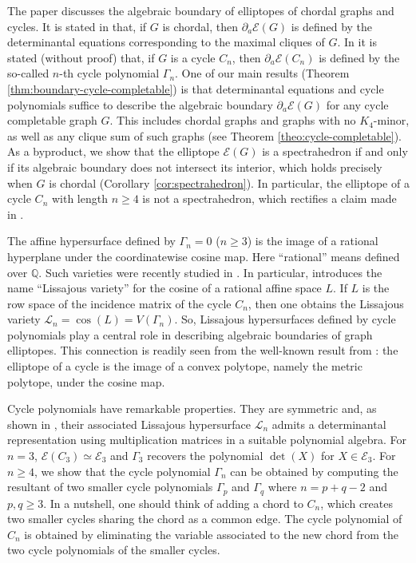 \documentclass[a4paper, 11pt, twoside]{article}
\newcommand{\ME}{{\mathcal E}}
\newcommand{\ML}{{\mathcal L}}
\theoremstyle{plain}
\begin{document}
The paper  \cite{Sturmfels2010MultivariateGaussians} discusses the algebraic boundary of elliptopes of chordal graphs and cycles. It is stated in \cite[Proposition 4.1]{Sturmfels2010MultivariateGaussians} that, if $G$ is chordal, then $\partial_a \ME(G)$ is defined by the determinantal equations corresponding to the maximal cliques of $G$. In \cite[Section 4.2]{Sturmfels2010MultivariateGaussians} it is stated (without proof) that, if $G$ is a cycle $C_n$, then $\partial_a \ME(C_n)$ is defined by the so-called $n$-th cycle polynomial $\Gamma_n$.
One of our main results (Theorem \ref{thm:boundary-cycle-completable}) is that determinantal equations and cycle polynomials suffice to describe the algebraic boundary $\partial_a \ME(G)$ for any cycle completable graph $G$. This includes chordal graphs and graphs with no $K_4$-minor, as well as any clique sum of such graphs (see Theorem \ref{theo:cycle-completable}). As a byproduct, we show that the elliptope $\ME(G)$ is a spectrahedron if and only if its algebraic boundary does not intersect its interior, which holds precisely when $G$ is chordal (Corollary \ref{cor:spectrahedron}). In particular, the elliptope of a cycle $C_n$ with length $n\ge 4$ is not a spectrahedron, which rectifies a claim made in \cite[Section~4.2]{Sturmfels2010MultivariateGaussians}. 

The affine hypersurface defined by $\Gamma_n = 0$ ($n\ge 3$) is the image of a rational hyperplane under the coordinatewise cosine map. Here ``rational'' means defined over $\mathbb{Q}$. Such varieties were recently studied in  \cite{BelAfiaMeroniTelen2025Chebyshev,mascarin2025lissajousvarieties}. In particular, \cite{mascarin2025lissajousvarieties} introduces the name ``Lissajous variety'' for the cosine of a rational affine space $L$. If $L$ is the row space of the incidence matrix of the cycle $C_n$, then one obtains the Lissajous variety $\ML_n = \cos(L) =  V(\Gamma_n)$. 
So, Lissajous hypersurfaces defined by cycle polynomials play a central role in describing algebraic boundaries of graph elliptopes.
This connection is readily seen from the well-known result from \cite{Barrett1993realpositivedefinite}: the elliptope of a cycle is the image of a convex polytope, namely the metric polytope, under the cosine map.

Cycle polynomials have remarkable properties. They are symmetric and, as shown in \cite{mascarin2025lissajousvarieties}, their associated Lissajous hypersurface $\ML_n$  admits a determinantal representation using multiplication matrices in a suitable polynomial algebra.
 For $n=3$, $\ME(C_3)\simeq\ME_3$ and  $\Gamma_3$ recovers the  polynomial $\det(X)$ for $X\in\ME_3$. For $n\ge 4$, we show that  the cycle polynomial $\Gamma_n$ can be obtained by computing  the resultant of two smaller cycle polynomials $\Gamma_p$ and $\Gamma_q$ where $n=p+q-2$ and $p,q\ge 3$. In a nutshell, one should think of adding a chord to $C_n$, which creates two smaller cycles sharing the chord as a common edge. The cycle polynomial of $C_n$ is obtained by eliminating the variable associated to the new chord from the two cycle polynomials of the smaller cycles. 
 
\end{document}
